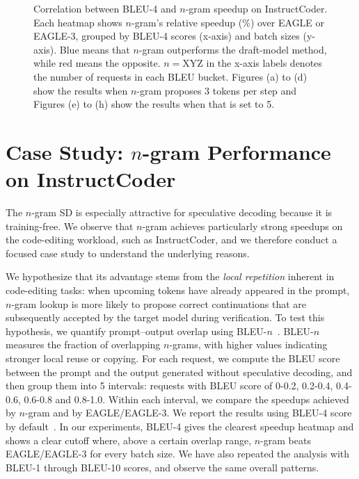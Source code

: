 \documentclass{article}
\begin{document}
\begin{figure}[h!]
\begin{center}
\caption{Correlation between BLEU-4 and $n$-gram speedup on InstructCoder. Each heatmap shows $n$-gram’s relative speedup (\%) over EAGLE or EAGLE-3, grouped by BLEU-4 scores (x-axis) and batch sizes (y-axis). Blue means that $n$-gram outperforms the draft-model method, while red means the opposite. $n{=}$XYZ in the x-axis labels denotes the number of requests in each BLEU bucket. Figures (a) to (d) show the results when $n$-gram proposes 3 tokens per step and Figures (e) to (h) show the results when that is set to 5.}
\label{fig:ngram_bleu_heatmap}
\vspace{-0.2in}
\end{center}
\end{figure}




\section{Case Study: $n$-gram Performance on InstructCoder}
\label{subsect:ngram-bleu-score}


The $n$-gram SD is especially attractive for speculative decoding because it is training-free.
We observe that $n$-gram achieves particularly strong speedups on the code-editing workload, such as InstructCoder, and we therefore conduct a focused case study to understand the underlying reasons.

We hypothesize that its advantage stems from the \emph{local repetition} inherent in code-editing tasks: when upcoming tokens have already appeared in the prompt, $n$-gram lookup is more likely to propose correct continuations that are subsequently accepted by the target model during verification.
To test this hypothesis, we quantify prompt–output overlap using BLEU-$n$~\cite{papineni2002bleu}.
BLEU-$n$ measures the fraction of overlapping $n$-grams, with higher values indicating stronger local reuse or copying.
For each request, we compute the BLEU score between the prompt and the output generated without speculative decoding, and then group them into 5 intervals: requests with BLEU score of 0-0.2, 0.2-0.4, 0.4-0.6, 0.6-0.8 and 0.8-1.0.
Within each interval, we compare the speedups achieved by $n$-gram and by EAGLE/EAGLE-3.
We report the results using BLEU-4 score by default~\cite{papineni2002bleu}. In our experiments, BLEU-4 gives the clearest speedup heatmap and shows a clear cutoff where, above a certain overlap range, $n$-gram beats EAGLE/EAGLE-3 for every batch size. We have also repeated the analysis with BLEU-1 through BLEU-10 scores, and observe the same overall patterns.
\end{document}
